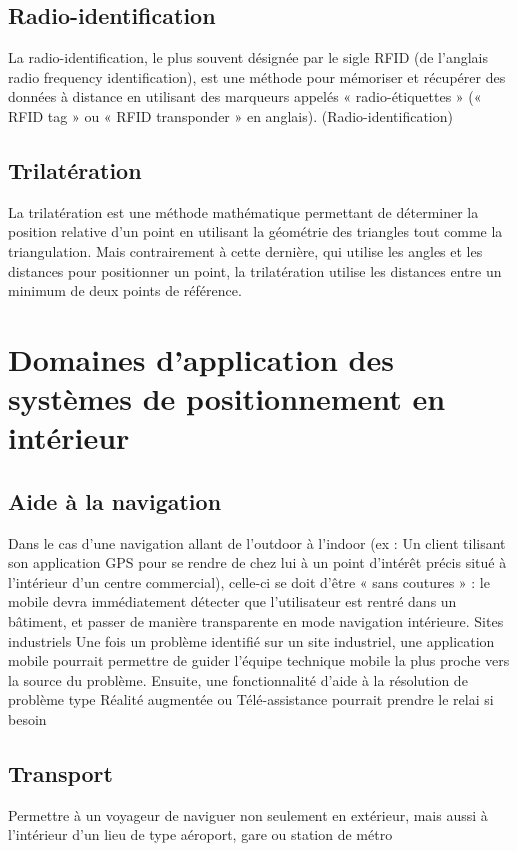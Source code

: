 \documentclass[12pt,a4paper]{report}
\begin{document}
\subsection{Radio-identification}
	La radio-identification, le plus souvent désignée par le sigle RFID (de l’anglais radio frequency identification), est une méthode pour mémoriser et récupérer des données à distance en utilisant des marqueurs appelés « radio-étiquettes » (« RFID tag » ou « RFID transponder » en anglais). (Radio-identification)\cite{rfid}

\subsection{Trilatération}

La trilatération est une méthode mathématique permettant de déterminer la position relative d'un point en utilisant la géométrie des triangles tout comme la triangulation. Mais contrairement à cette dernière, qui utilise les angles et les distances pour positionner un point, la trilatération utilise les distances entre un minimum de deux points de référence.\cite{trilateration}


\section{Domaines d’application des systèmes de positionnement en intérieur}

\subsection{Aide à la navigation}
Dans le cas d’une navigation allant de l’outdoor à l’indoor (ex : Un client tilisant son application GPS pour se rendre de chez lui à un point d’intérêt précis situé à l’intérieur d’un centre commercial), celle-ci se doit d’être « sans coutures » : le mobile devra immédiatement détecter que l’utilisateur est rentré dans un bâtiment, et passer de manière transparente en mode navigation intérieure.
Sites industriels Une fois un problème identifié sur un site industriel, une application mobile pourrait permettre de guider l’équipe technique mobile la plus proche vers la source du problème. Ensuite, une fonctionnalité d’aide à la résolution de problème type Réalité augmentée ou Télé-assistance pourrait prendre le relai si besoin\cite{navigation}


\subsection{Transport}
Permettre à un voyageur de naviguer non seulement en extérieur, mais aussi à l’intérieur d’un lieu de type aéroport, gare ou station de métro\cite{transport}%
\end{document}
